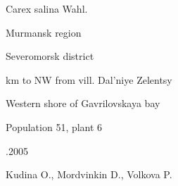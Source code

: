 \documentclass{etiketka}
\begin{document}
\begin{etiketka}

\Name Carex salina Wahl.

\Reg Murmansk region

\Dist Severomorsk district

 km to NW from vill. Dal'niye Zelentsy

\Habit Western shore of Gavrilovskaya bay


Population 51, plant 6

.2005

\Coll Kudina O., Mordvinkin D., Volkova P.

\end{etiketka}
\end{document}
